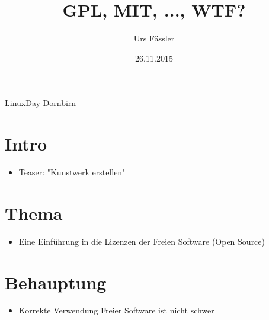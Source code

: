 \usepackage[utf8x]{inputenc}
\usepackage{ucs}
\usepackage{amsmath}
\usepackage{amsfonts}
\usepackage{amssymb}
\usepackage{graphicx}
\usepackage{appendixnumberbeamer}
\usepackage{url}

\title{GPL, MIT, ..., WTF?}
\author{Urs Fässler}
\date{26.11.2015}
\institute
{
  LinuxDay Dornbirn
}

\newcommand{\todo}[1]{{\color{red}TODO \arabic{todonr}: #1\stepcounter{todonr}}}

\newcommand{\hnote}[1]{\only<handout>{\footnote{#1}}}
\newcommand{\hcite}[1]{\only<handout>{\cite{#1}}}


\beamertemplatenavigationsymbolsempty




\frame{\titlepage}

\section{Intro}
\note
{
  \begin{itemize}
    \item Teaser: "Kunstwerk erstellen"
  \end{itemize}
}

\section{Thema}
\note
{
  \begin{itemize}
    \item Eine Einführung in die Lizenzen der Freien Software (Open Source)
  \end{itemize}
}

\section{Behauptung}
\note
{
  \begin{itemize}
    \item Korrekte Verwendung Freier Software ist nicht schwer
  \end{itemize}
}

